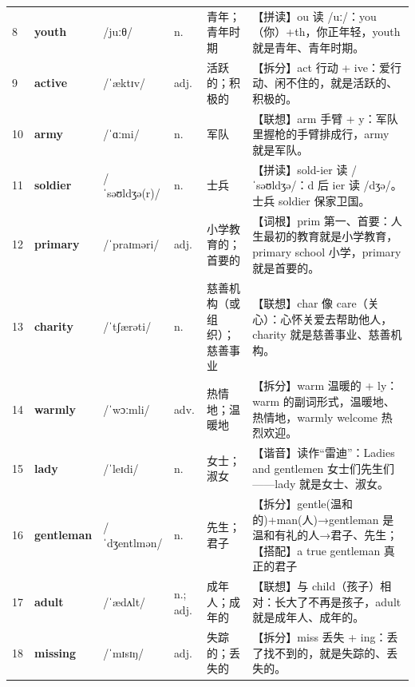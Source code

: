\documentclass[UTF8,a4paper,11pt,oneside]{ctexbook}
\newcommand{\cellword}[1]{{\bfseries\textcolor{wordcol}{#1}}}
\newcommand{\cellipa}[1]{{\footnotesize\textcolor{ipacol}{#1}}}
\newcommand{\cellpos}[1]{\textcolor{poscol}{#1}}
\newcommand{\cellno}[1]{\textcolor{volcolor!75!black}{#1}}
\begin{document}
{\begin{longtable}{@{}C{0.045\textwidth}L{0.155\textwidth}L{0.175\textwidth}C{0.070\textwidth}L{0.180\textwidth}L{0.282\textwidth}@{}}
\cellno{8} & \cellword{youth} & \cellipa{/juːθ/} & \cellpos{n.} & 青年；青年时期 & \textcolor{tagSpell}{【拼读】}ou 读 /uː/：you（你）+th，你正年轻，youth 就是青年、青年时期。 \\
 \cellno{9} & \cellword{active} & \cellipa{/ˈæktɪv/} & \cellpos{adj.} & 活跃的；积极的 & \textcolor{tagSplit}{【拆分】}act 行动 + ive：爱行动、闲不住的，就是活跃的、积极的。 \\
\cellno{10} & \cellword{army} & \cellipa{/ˈɑːmi/} & \cellpos{n.} & 军队 & \textcolor{tagAssoc}{【联想】}arm 手臂 + y：军队里握枪的手臂排成行，army 就是军队。 \\
 \cellno{11} & \cellword{soldier} & \cellipa{/ˈsəʊldʒə(r)/} & \cellpos{n.} & 士兵 & \textcolor{tagSpell}{【拼读】}sold-ier 读 /ˈsəʊldʒə/：d 后 ier 读 /dʒə/。士兵 soldier 保家卫国。 \\
\cellno{12} & \cellword{primary} & \cellipa{/ˈpraɪməri/} & \cellpos{adj.} & 小学教育的；首要的 & \textcolor{tagRoot}{【词根】}prim 第一、首要：人生最初的教育就是小学教育，primary school 小学，primary 就是首要的。 \\
 \cellno{13} & \cellword{charity} & \cellipa{/ˈtʃærəti/} & \cellpos{n.} & 慈善机构（或组织）；慈善事业 & \textcolor{tagAssoc}{【联想】}char 像 care（关心）：心怀关爱去帮助他人，charity 就是慈善事业、慈善机构。 \\
\cellno{14} & \cellword{warmly} & \cellipa{/ˈwɔːmli/} & \cellpos{adv.} & 热情地；温暖地 & \textcolor{tagSplit}{【拆分】}warm 温暖的 + ly：warm 的副词形式，温暖地、热情地，warmly welcome 热烈欢迎。 \\
 \cellno{15} & \cellword{lady} & \cellipa{/ˈleɪdi/} & \cellpos{n.} & 女士；淑女 & \textcolor{tagSound}{【谐音】}读作“雷迪”：Ladies and gentlemen 女士们先生们——lady 就是女士、淑女。 \\
\cellno{16} & \cellword{gentleman} & \cellipa{/ˈdʒentlmən/} & \cellpos{n.} & 先生；君子 & \textcolor{tagSplit}{【拆分】}gentle(温和的)+man(人)→\allowbreak{}gentleman 是温和有礼的人→\allowbreak{}君子、先生；\textcolor{tagColloc}{【搭配】}a true gentleman 真正的君子 \\
 \cellno{17} & \cellword{adult} & \cellipa{/ˈædʌlt/} & \cellpos{n.;\allowbreak{} adj.} & 成年人；成年的 & \textcolor{tagAssoc}{【联想】}与 child（孩子）相对：长大了不再是孩子，adult 就是成年人、成年的。 \\
\cellno{18} & \cellword{missing} & \cellipa{/ˈmɪsɪŋ/} & \cellpos{adj.} & 失踪的；丢失的 & \textcolor{tagSplit}{【拆分】}miss 丢失 + ing：丢了找不到的，就是失踪的、丢失的。 \\

\end{longtable}}
\end{document}
